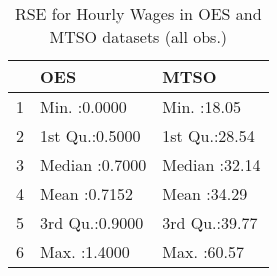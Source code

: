 \begin{table}[ht]
\centering
\begin{tabular}{rll}
  \hline
 &      OES &      MTSO \\ 
  \hline
1 & Min.   :0.0000   & Min.   :18.05   \\ 
  2 & 1st Qu.:0.5000   & 1st Qu.:28.54   \\ 
  3 & Median :0.7000   & Median :32.14   \\ 
  4 & Mean   :0.7152   & Mean   :34.29   \\ 
  5 & 3rd Qu.:0.9000   & 3rd Qu.:39.77   \\ 
  6 & Max.   :1.4000   & Max.   :60.57   \\ 
   \hline
\end{tabular}
\caption{RSE for Hourly Wages in OES and MTSO datasets (all obs.)} 
\label{tab:rse_oes_mtso1}
\end{table}
